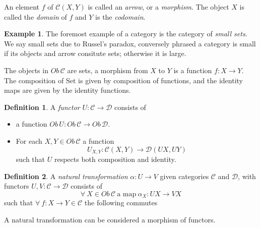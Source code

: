 \documentclass{article}
\theoremstyle{definition}
\newtheorem{definition}{Definition}[section]
\newtheorem{example}{Example}[section]
\begin{document}
\par
An element $f$ of $\mathcal{C}(X,Y)$ is called an \textit{arrow},
or a \textit{morphism}. The object $X$ is called the \textit{domain} of $f$ and $Y$ is
the \textit{codomain}.

\begin{example}
    The foremost example of a category is the category of \textit{small sets}.
    We say small sets due to Russel's paradox, conversely phrased a category is small
    if its objects and arrow consitute sets; otherwise it is large.

    The objects in $Ob\,\mathcal{C}$ are sets,
    a morphism from $X$ to $Y$ is a function $f : X \rightarrow Y$.
    The composition of Set is given by composition of functions,
    and the identity maps are given by the identity functions.
\end{example}

\begin{definition}
    A \textit{functor} $U : \mathcal{C} \rightarrow \mathcal{D}$ consists of
    \begin{itemize}
        \item a function $Ob\,U : Ob\,\mathcal{C} \rightarrow Ob\,\mathcal{D}$.
        \item For each $X, Y \in Ob\,\mathcal{C}$ a function
            $$U_{X,Y} : \mathcal{C}(X,Y) \rightarrow \mathcal{D}(UX, UY)$$
            such that $U$ respects both composition and identity.
    \end{itemize}
\end{definition}

\begin{definition}
    A \textit{natural transformation} $\alpha : U \rightarrow V$
    given categories $\mathcal{C}$ and $\mathcal{D}$,
    with functors $U, V : \mathcal{C} \rightarrow \mathcal{D}$
    consists of
    $$
    \forall\ X \in Ob\,\mathcal{C}\ \textrm{a map}
    \ \alpha_X : UX \rightarrow VX
    $$
    such that $\forall\ f : X \rightarrow Y \in \mathcal{C}$ the following commutes
    \begin{center}
    \end{center}
    A natural transformation can be considered a morphism of functors.
\end{definition}
\end{document}
